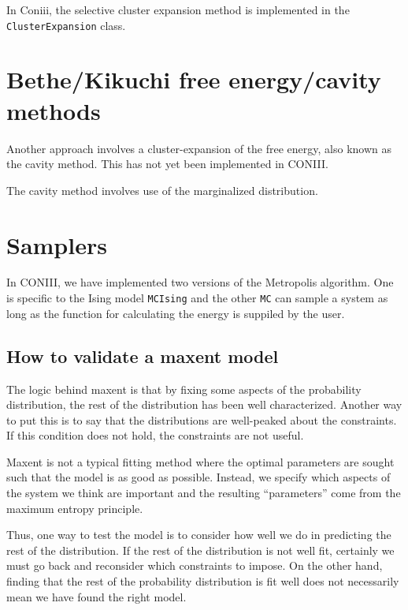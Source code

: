 \documentclass[aps,prl,twocolumn]{revtex4-1}
\begin{document}
In Coniii, the selective cluster expansion method is implemented in the {\tt ClusterExpansion} class.

\section{Bethe/Kikuchi free energy/cavity methods}
Another approach involves a cluster-expansion of the free energy, also known as the cavity method. This has not yet been implemented in CONIII.

The cavity method involves use of the marginalized distribution.

\section{Samplers}
In CONIII, we have implemented two versions of the Metropolis algorithm. One is specific to the Ising model {\tt MCIsing} and the other {\tt MC} can sample a system as long as the function for calculating the energy is suppiled by the user.

\subsection{How to validate a maxent model}
The logic behind maxent is that by fixing some aspects of the probability distribution, the rest of the distribution has been well characterized.
Another way to put this is to say that the distributions are well-peaked about the constraints. If this condition does not hold, the constraints are not useful.

Maxent is not a typical fitting method where the optimal parameters are sought such that the model is as good as possible. Instead, we specify which aspects of the system we think are important and the resulting ``parameters'' come from the maximum entropy principle.

Thus, one way to test the model is to consider how well we do in predicting the rest of the distribution. If the rest of the distribution is not well fit, certainly we must go back and reconsider which constraints to impose. On the other hand, finding that the rest of the probability distribution is fit well does not necessarily mean we have found the right model.

\end{document}
